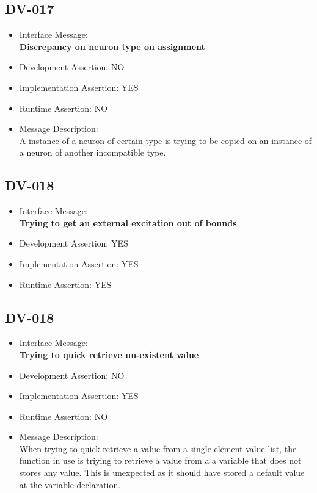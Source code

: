\subsection{DV-017}
\begin{itemize}
  \item Interface Message:\\[1em]
    \textbf{Discrepancy on neuron type on assignment}
  \item Development Assertion: NO
  \item Implementation Assertion: YES
  \item Runtime Assertion: NO
  \item Message Description:\\[1em]
    A instance of a neuron of certain type is trying to be copied on an instance of a neuron of another incompatible type.
\end{itemize}

\subsection{DV-018}
\begin{itemize}
  \item Interface Message:\\[1em]
    \textbf{Trying to get an external excitation out of bounds}
  \item Development Assertion: YES
  \item Implementation Assertion: YES
  \item Runtime Assertion: YES
\end{itemize}

\subsection{DV-018}
\begin{itemize}
  \item Interface Message:\\[1em]
    \textbf{Trying to quick retrieve un-existent value}
  \item Development Assertion: NO
  \item Implementation Assertion: YES
  \item Runtime Assertion: NO
  \item Message Description:\\[1em]
    When trying to quick retrieve a value from a single element value list, the function in use is triying to retrieve a value from a a variable that does not stores any value. This is unexpected as it should have stored a default value at the variable declaration.
\end{itemize}

